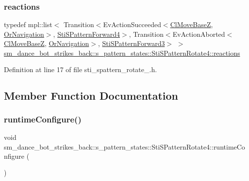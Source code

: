 \subsubsection{\texorpdfstring{reactions}{reactions}}
{\footnotesize\ttfamily typedef mpl\+::list$<$ Transition$<$Ev\+Action\+Succeeded$<$\hyperlink{classcl__move__base__z_1_1ClMoveBaseZ}{Cl\+Move\+BaseZ}, \hyperlink{classsm__dance__bot__strikes__back_1_1OrNavigation}{Or\+Navigation}$>$, \hyperlink{structsm__dance__bot__strikes__back_1_1s__pattern__states_1_1StiSPatternForward4}{Sti\+S\+Pattern\+Forward4}$>$, Transition$<$Ev\+Action\+Aborted$<$\hyperlink{classcl__move__base__z_1_1ClMoveBaseZ}{Cl\+Move\+BaseZ}, \hyperlink{classsm__dance__bot__strikes__back_1_1OrNavigation}{Or\+Navigation}$>$, \hyperlink{structsm__dance__bot__strikes__back_1_1s__pattern__states_1_1StiSPatternForward3}{Sti\+S\+Pattern\+Forward3}$>$ $>$ \hyperlink{structsm__dance__bot__strikes__back_1_1s__pattern__states_1_1StiSPatternRotate4_a8e931a92d216e81b8343aa94a6b5aa23}{sm\+\_\+dance\+\_\+bot\+\_\+strikes\+\_\+back\+::s\+\_\+pattern\+\_\+states\+::\+Sti\+S\+Pattern\+Rotate4\+::reactions}}



Definition at line 17 of file sti\+\_\+spattern\+\_\+rotate\+\_.\+h.



\subsection{Member Function Documentation}
\mbox{\label{structsm__dance__bot__strikes__back_1_1s__pattern__states_1_1StiSPatternRotate4_a3c194d4342eb3906d96697a88857f9bd}} 
\subsubsection{\texorpdfstring{runtime\+Configure()}{runtimeConfigure()}}
{\footnotesize\ttfamily void sm\+\_\+dance\+\_\+bot\+\_\+strikes\+\_\+back\+::s\+\_\+pattern\+\_\+states\+::\+Sti\+S\+Pattern\+Rotate4\+::runtime\+Configure (\begin{DoxyParamCaption}{ }\end{DoxyParamCaption})\hspace{0.3cm}{\ttfamily [inline]}}



